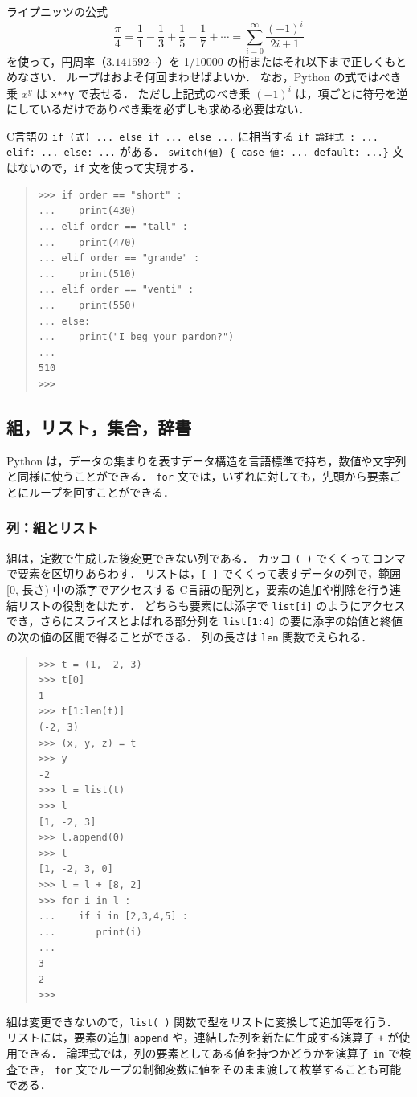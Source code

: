\documentclass[11pt,a4,epsf]{report}
\begin{document}
\begin{excercise}
ライプニッツの公式
\[
\frac{\pi}{4} = \frac{1}{1} - \frac{1}{3} + \frac{1}{5} - \frac{1}{7} + \cdots = \sum_{i=0}^{\infty}\frac{(-1)^i}{2i+1}
\]
を使って，円周率（$3.141592\cdots$）を 1/10000 の桁またはそれ以下まで正しくもとめなさい．
ループはおよそ何回まわせばよいか．
なお，Python の式ではべき乗 $x^y$ は \verb+x**y+ で表せる．
ただし上記式のべき乗 $(-1)^i$ は，項ごとに符号を逆にしているだけでありべき乗を必ずしも求める必要はない．
\end{excercise}


C言語の \verb+if (式) ... else if ... else ...+ に相当する \verb+if 論理式 : ... elif: ... else: ...+ がある．
\verb+switch(値) { case 値: ... default: ...}+ 文はないので，\verb+if+ 文を使って実現する．
\begin{quote}
\small
\begin{verbatim}
>>> if order == "short" :
...    print(430)
... elif order == "tall" :
...    print(470)
... elif order == "grande" :
...    print(510)
... elif order == "venti" :
...    print(550)
... else:
...    print("I beg your pardon?")
...
510
>>>
\end{verbatim}
\end{quote}

\subsection{組，リスト，集合，辞書}

Python は，データの集まりを表すデータ構造を言語標準で持ち，数値や文字列と同様に使うことができる．
\verb+for+ 文では，いずれに対しても，先頭から要素ごとにループを回すことができる．

\subsubsection{列：組とリスト}
組は，定数で生成した後変更できない列である．
カッコ \verb+( )+ でくくってコンマで要素を区切りあらわす．
リストは，\verb+[ ]+ でくくって表すデータの列で，範囲 [0, 長さ) 中の添字でアクセスする C言語の配列と，要素の追加や削除を行う連結リストの役割をはたす．
どちらも要素には添字で \verb+list[i]+ のようにアクセスでき，さらにスライスとよばれる部分列を \verb+list[1:4]+ の要に添字の始値と終値の次の値の区間で得ることができる．
列の長さは \verb+len+ 関数でえられる．
\begin{quote}
\small
\begin{verbatim}
>>> t = (1, -2, 3)
>>> t[0]
1
>>> t[1:len(t)]
(-2, 3)
>>> (x, y, z) = t
>>> y
-2
>>> l = list(t)
>>> l
[1, -2, 3]
>>> l.append(0)
>>> l
[1, -2, 3, 0]
>>> l = l + [8, 2]
>>> for i in l :
...    if i in [2,3,4,5] :
...       print(i)
...
3
2
>>>
\end{verbatim}
\end{quote}
組は変更できないので，\verb+list( )+ 関数で型をリストに変換して追加等を行う．
リストには，要素の追加 \verb+append+ や，連結した列を新たに生成する演算子 \verb$+$ が使用できる．
論理式では，列の要素としてある値を持つかどうかを演算子 \verb+in+ で検査でき，
\verb+for+ 文でループの制御変数に値をそのまま渡して枚挙することも可能である．
\end{document}
